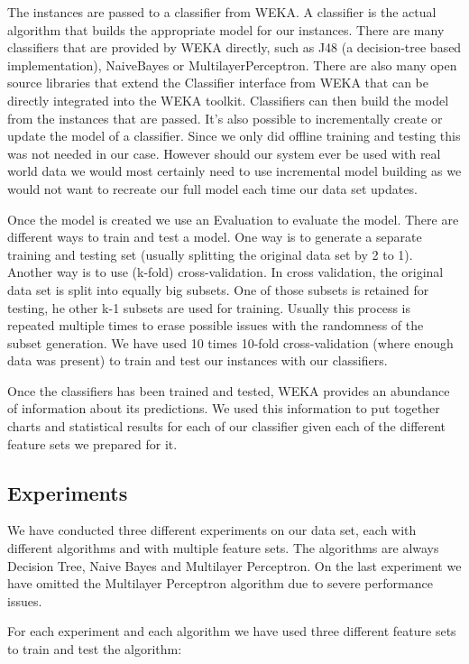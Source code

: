 The instances are passed to a classifier from WEKA. A classifier is the actual algorithm that builds the appropriate model for our instances. There are many classifiers that are provided by WEKA directly, such as J48 (a decision-tree based implementation), NaiveBayes or MultilayerPerceptron. There are also many open source libraries that extend the Classifier interface from WEKA that can be directly integrated into the WEKA toolkit. Classifiers can then build the model from the instances that are passed. It's also possible to incrementally create or update the model of a classifier. Since we only did offline training and testing this was not needed in our case. However should our system ever be used with real world data we would most certainly need to use incremental model building as we would not want to recreate our full model each time our data set updates.

Once the model is created we use an Evaluation to evaluate the model. There are different ways to train and test a model. One way is to generate a separate training and testing set (usually splitting the original data set by 2 to 1). Another way is to use (k-fold) cross-validation. In cross validation, the original data set is split into equally big subsets. One of those subsets is retained for testing, he other k-1 subsets are used for training. Usually this process is repeated multiple times to erase possible issues with the randomness of the subset generation. We have used 10 times 10-fold cross-validation (where enough data was present) to train and test our instances with our classifiers.

Once the classifiers has been trained and tested, WEKA provides an abundance of information about its predictions. We used this information to put together charts and statistical results for each of our classifier given each of the different feature sets we prepared for it.

\subsection{Experiments}
We have conducted three different experiments on our data set, each with different algorithms and with multiple feature sets. The algorithms are always Decision Tree, Naive Bayes and Multilayer Perceptron. On the last experiment we have omitted the Multilayer Perceptron algorithm due to severe performance issues.

For each experiment and each algorithm we have used three different feature sets to train and test the algorithm:

